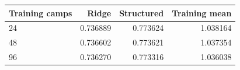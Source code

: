 \footnotesize\setlength{\tabcolsep}{3pt}\begin{tabular*}{\columnwidth}{@{\extracolsep{\fill}}lrrr}
\toprule
Training camps & Ridge & Structured & Training mean \\
\midrule
24 & 0.736889 & 0.773624 & 1.038164 \\
48 & 0.736602 & 0.773621 & 1.037354 \\
96 & 0.736270 & 0.773316 & 1.036038 \\
\bottomrule
\end{tabular*}
